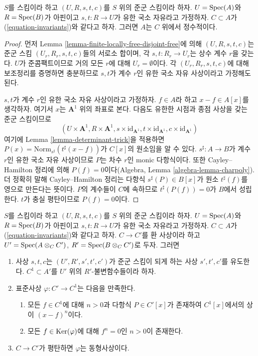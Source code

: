 \begin{lemma}
\label{lemma-integral-over-invariants}
$S$를 스킴이라 하고 $(U, R, s, t, c)$를 $S$ 위의 준군 스킴이라 하자. $U = \mathop{\mathrm{Spec}}(A)$와 $R = \mathop{\mathrm{Spec}}(B)$가
아핀이고 $s, t : R \to U$가 유한 국소 자유라고 가정하자. $C \subset A$가
(\ref{equation-invariants})와 같다고 하자. 그러면 $A$는 $C$ 위에서 정수적이다.
\end{lemma}

\begin{proof}
먼저 Lemma \ref{lemma-finite-locally-free-disjoint-free}에 의해 $(U, R, s, t, c)$는 준군 스킴
$(U_r, R_r, s, t, c)$들의 서로소 합이며, 각 $s, t : R_r \to U_r$는 상수 계수 $r$을 갖는다. $U$가 준콤팩트이므로
거의 모든 $r$에 대해 $U_r = \emptyset$이다. 각 $(U_r, R_r, s, t, c)$에 대해 보조정리를 증명하면 충분하므로
$s, t$가 계수 $r$인 유한 국소 자유 사상이라고 가정해도 된다.

\medskip\noindent
$s, t$가 계수 $r$인 유한 국소 자유 사상이라고 가정하자. $f \in A$라 하고 $x - f \in A[x]$를 생각하자.
여기서 $x$는 $\mathbf{A}^1$ 위의 좌표로 본다. 다음도 유한한 시점과 종점 사상을 갖는 준군 스킴이므로
$$
(U \times \mathbf{A}^1, R \times \mathbf{A}^1,
s \times \text{id}_{\mathbf{A}^1},
t \times \text{id}_{\mathbf{A}^1},
c \times \text{id}_{\mathbf{A}^1})
$$
여기에 Lemma \ref{lemma-determinant-trick}을 적용하면
$P(x) = \text{Norm}_{s^\sharp}(t^\sharp(x - f))$가 $C[x]$의 원소임을 알 수 있다.
$s^\sharp : A \to B$가 계수 $r$인 유한 국소 자유 사상이므로 $P$는 차수 $r$인 monic 다항식이다.
또한 Cayley--Hamilton 정리에 의해 $P(f) = 0$이다(Algebra, Lemma \ref{algebra-lemma-charpoly}). 더 정확히 말해
Cayley--Hamilton 정리는 다항식 $s^\sharp(P) \in B[x]$가 원소 $t^\sharp(f)$를 영으로 만든다는 뜻이다.
$P$의 계수들이 $C$에 속하므로 $t^\sharp(P(f)) = 0$가 $B$에서 성립한다. $t$가 충실 평탄이므로 $P(f) = 0$이다.
\end{proof}

\begin{lemma}
\label{lemma-invariants-base-change}
$S$를 스킴이라 하고 $(U, R, s, t, c)$를 $S$ 위의 준군 스킴이라 하자. $U = \mathop{\mathrm{Spec}}(A)$와 $R = \mathop{\mathrm{Spec}}(B)$가
아핀이고 $s, t : R \to U$가 유한 국소 자유라고 가정하자. $C \subset A$가 (\ref{equation-invariants})와 같다고 하자.
$C \to C'$를 환 사상이라 하고 $U' = \mathop{\mathrm{Spec}}(A \otimes_C C')$, $R' = \mathop{\mathrm{Spec}}(B \otimes_C C')$로 두자. 그러면
\begin{enumerate}
\item 사상 $s, t, c$는 $(U', R', s', t', c')$가 준군 스킴이 되게 하는 사상 $s', t', c'$를 유도한다.
$C^1 \subset A'$를 $U'$ 위의 $R'$-불변함수들이라 하자.
\item 표준사상 $\varphi : C' \to C^1$는 다음을 만족한다.
\begin{enumerate}
\item 모든 $f \in C^1$에 대해 $n > 0$과 다항식 $P \in C'[x]$가 존재하여 $C^1[x]$에서의 상이 $(x - f)^n$이다.
\item 모든 $f \in \mathop{\mathrm{Ker}}(\varphi)$에 대해 $f^n = 0$인 $n > 0$이 존재한다.
\end{enumerate}
\item $C \to C'$가 평탄하면 $\varphi$는 동형사상이다.
\end{enumerate}
\end{lemma}

